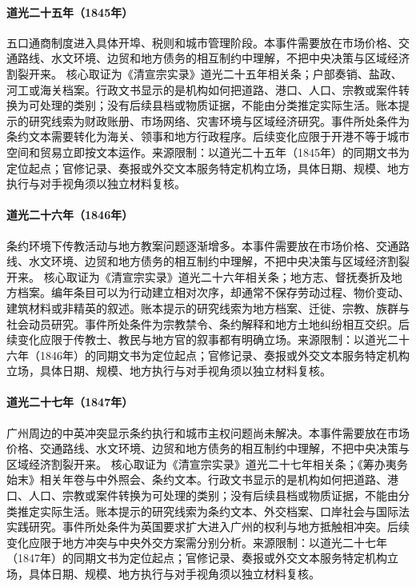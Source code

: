 \hypertarget{civic:EQ-1845-TREATY-PORT-OPENING}{}\paragraph{道光二十五年（1845年）}五口通商制度进入具体开埠、税则和城市管理阶段。本事件需要放在市场价格、交通路线、水文环境、边贸和地方债务的相互制约中理解，不把中央决策与区域经济割裂开来。 核心取证为《清宣宗实录》道光二十五年相关条；户部奏销、盐政、河工或海关档案。行政文书显示的是机构如何把道路、港口、人口、宗教或案件转换为可处理的类别；没有后续县档或物质证据，不能由分类推定实际生活。账本提示的研究线索为财政账册、市场网络、灾害环境与区域经济研究。事件所处条件为条约文本需要转化为海关、领事和地方行政程序。后续变化应限于开港不等于城市空间和贸易立即按文本运作。来源限制：以道光二十五年（1845年）的同期文书为定位起点；官修记录、奏报或外交文本服务特定机构立场，具体日期、规模、地方执行与对手视角须以独立材料复核。
\hypertarget{civic:EQ-1846-MISSIONARY-RETURN}{}\paragraph{道光二十六年（1846年）}条约环境下传教活动与地方教案问题逐渐增多。本事件需要放在市场价格、交通路线、水文环境、边贸和地方债务的相互制约中理解，不把中央决策与区域经济割裂开来。 核心取证为《清宣宗实录》道光二十六年相关条；地方志、督抚奏折及地方档案。编年条目可以为行动建立相对次序，却通常不保存劳动过程、物价变动、建筑材料或非精英的叙述。账本提示的研究线索为地方档案、迁徙、宗教、族群与社会动员研究。事件所处条件为宗教禁令、条约解释和地方土地纠纷相互交织。后续变化应限于传教士、教民与地方官的叙事都有明确立场。来源限制：以道光二十六年（1846年）的同期文书为定位起点；官修记录、奏报或外交文本服务特定机构立场，具体日期、规模、地方执行与对手视角须以独立材料复核。
\hypertarget{civic:EQ-1847-GUANGZHOU-CONFLICT}{}\paragraph{道光二十七年（1847年）}广州周边的中英冲突显示条约执行和城市主权问题尚未解决。本事件需要放在市场价格、交通路线、水文环境、边贸和地方债务的相互制约中理解，不把中央决策与区域经济割裂开来。 核心取证为《清宣宗实录》道光二十七年相关条；《筹办夷务始末》相关年卷与中外照会、条约文本。行政文书显示的是机构如何把道路、港口、人口、宗教或案件转换为可处理的类别；没有后续县档或物质证据，不能由分类推定实际生活。账本提示的研究线索为条约文本、外交档案、口岸社会与国际法实践研究。事件所处条件为英国要求扩大进入广州的权利与地方抵触相冲突。后续变化应限于地方冲突与中央外交方案需分别分析。来源限制：以道光二十七年（1847年）的同期文书为定位起点；官修记录、奏报或外交文本服务特定机构立场，具体日期、规模、地方执行与对手视角须以独立材料复核。
